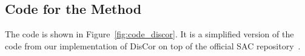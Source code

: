 \documentclass[jmlr]{article}
\begin{document}
\subsection{Code for the Method}
\label{sec:code}
The code is shown in Figure~\ref{fig:code_discor}. It is a simplified version of the code from our implementation of DisCor on top of the official SAC repository~\citep{haarnoja2018sacapps}.




 
\end{document}
